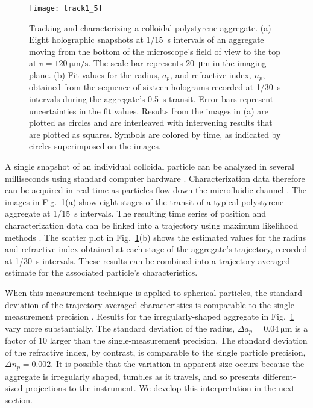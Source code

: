 \begin{figure}[!b]
  \centering
  \texttt{[image: track1\_5]}
  \caption[Tracking a colloidal polystyrene aggregate]
  {Tracking and characterizing a colloidal polystyrene
    aggregate.  (a) Eight holographic snapshots at \SI{1/15}{\second}
    intervals of an aggregate moving from the bottom of the microscope's field of
    view to the top at $v = \SI{120}{\um\per\second}$.  
    The scale bar represents \SI{20}{\um} in the imaging plane.
    (b) Fit values for the radius, $a_p$, and refractive index,
    $n_p$, obtained from the sequence of sixteen
    holograms recorded at \SI{1/30}{\second} intervals during the
    aggregate's \SI{0.5}{\second} transit.  Error bars
    represent uncertainties in the fit values.  Results from the
    images in (a) are plotted as circles and are interleaved with
    intervening results that are plotted as squares.
    Symbols are colored
    by time, as indicated by circles superimposed on the images.}
  \label{fig:track}
\end{figure}

A single snapshot of an individual colloidal particle can be analyzed
in several milliseconds using standard computer hardware
\cite{cheong09,yevick14}.
Characterization data therefore can be acquired in real time
as particles flow down the microfluidic channel \cite{cheong09}.
The images in Fig.~\ref{fig:track}(a) show eight stages of the transit
of a typical polystyrene aggregate at \SI{1/15}{\second} intervals.
The resulting time series of position and characterization data 
can be linked into a trajectory using maximum
likelihood methods \cite{crocker96,cheong09}.
The scatter plot in Fig.~\ref{fig:track}(b) shows the 
estimated values for the radius and refractive index obtained 
at each stage of the aggregate's
trajectory, recorded at \SI{1/30}{\second} intervals.
These results can be combined
into a trajectory-averaged estimate for the associated particle's characteristics.

When this measurement technique is applied to 
spherical particles, the standard deviation of the
trajectory-averaged characteristics is comparable to the
single-measurement precision \cite{cheong09,krishnatreya14}.
Results for the irregularly-shaped aggregate in Fig.~\ref{fig:track}
vary more substantially.
The standard deviation of the radius,
$\Delta a_p = \SI{0.04}{\um}$ is a factor of 10 larger
than the single-measurement precision.
The standard deviation of the refractive index, by contrast,
is comparable to the single particle precision,
$\Delta n_p = \num{0.002}$.
It is possible that the variation in apparent size occurs because
the aggregate is irregularly shaped, tumbles as it travels, and
so presents different-sized projections to the instrument.
We develop this interpretation in the next section.

